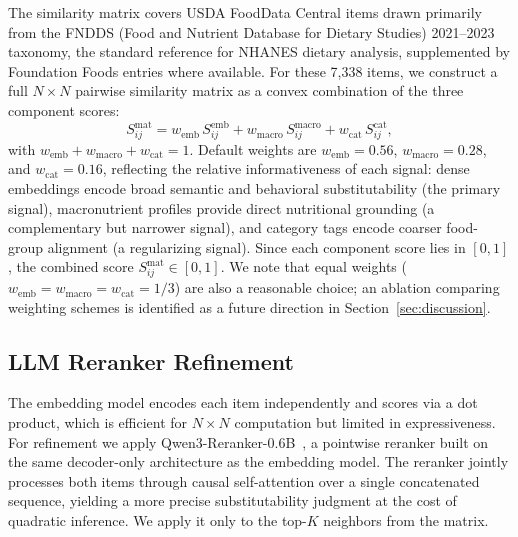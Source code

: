 \documentclass[journal]{IEEEtran}
\begin{document}
The similarity matrix covers USDA FoodData Central items drawn primarily
from the FNDDS (Food and Nutrient Database for Dietary Studies)
2021--2023 taxonomy, the standard reference for NHANES dietary analysis,
supplemented by Foundation Foods entries where available. For these
7,338 items, we construct a full $N \times N$ pairwise similarity matrix
as a convex combination of the three component scores:
\begin{equation}
S_{ij}^{\mathrm{mat}} =
w_{\mathrm{emb}}\, S_{ij}^{\mathrm{emb}}
+ w_{\mathrm{macro}}\, S_{ij}^{\mathrm{macro}}
+ w_{\mathrm{cat}}\, S_{ij}^{\mathrm{cat}},
\label{eq:matrix_sim}
\end{equation}
with $w_{\mathrm{emb}} + w_{\mathrm{macro}} + w_{\mathrm{cat}} = 1$.
Default weights are $w_{\mathrm{emb}} = 0.56$, $w_{\mathrm{macro}} =
0.28$, and $w_{\mathrm{cat}} = 0.16$, reflecting the relative
informativeness of each signal: dense embeddings encode broad semantic
and behavioral substitutability (the primary signal), macronutrient
profiles provide direct nutritional grounding (a complementary but
narrower signal), and category tags encode coarser food-group alignment
(a regularizing signal). Since each component score lies in $[0,1]$,
the combined score $S_{ij}^{\mathrm{mat}} \in [0,1]$. We note that
equal weights ($w_{\mathrm{emb}} = w_{\mathrm{macro}} =
w_{\mathrm{cat}} = 1/3$) are also a reasonable choice; an ablation
comparing weighting schemes is identified as a future direction in
Section~\ref{sec:discussion}.

\subsection{LLM Reranker Refinement}
\label{subsec:reranker}

The embedding model encodes each item independently and scores via a dot
product, which is efficient for $N \times N$ computation but limited in
expressiveness. For refinement we apply
Qwen3-Reranker-0.6B~\cite{zhang2025qwen3embedding}, a pointwise
reranker built on the same decoder-only architecture as the embedding
model. The reranker jointly processes both items through causal
self-attention over a single concatenated sequence, yielding a more
precise substitutability judgment at the cost of quadratic inference. We
apply it only to the top-$K$ neighbors from the matrix.
\end{document}
